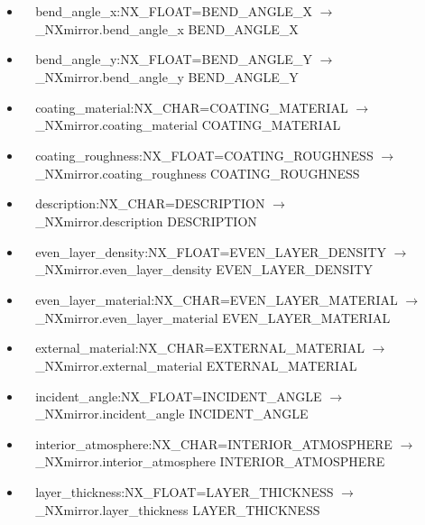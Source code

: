 \documentclass[11pt]{article}
\begin{document}
{{\begin{itemize}
\item{\verb|  |bend\_angle\_x:NX\_FLOAT=BEND\_ANGLE\_X $\rightarrow$\\
\verb|  |\_NXmirror.bend\_angle\_x BEND\_ANGLE\_X}

\item{\verb|  |bend\_angle\_y:NX\_FLOAT=BEND\_ANGLE\_Y $\rightarrow$\\
\verb|  |\_NXmirror.bend\_angle\_y BEND\_ANGLE\_Y}

\item{\verb|  |coating\_material:NX\_CHAR=COATING\_MATERIAL $\rightarrow$\\
\verb|  |\_NXmirror.coating\_material COATING\_MATERIAL}

\item{\verb|  |coating\_roughness:NX\_FLOAT=COATING\_ROUGHNESS $\rightarrow$\\
\verb|  |\_NXmirror.coating\_roughness COATING\_ROUGHNESS}

\item{\verb|  |description:NX\_CHAR=DESCRIPTION $\rightarrow$\\
\verb|  |\_NXmirror.description DESCRIPTION}

\item{\verb|  |even\_layer\_density:NX\_FLOAT=EVEN\_LAYER\_DENSITY $\rightarrow$\\
\verb|  |\_NXmirror.even\_layer\_density EVEN\_LAYER\_DENSITY}

\item{\verb|  |even\_layer\_material:NX\_CHAR=EVEN\_LAYER\_MATERIAL $\rightarrow$\\
\verb|  |\_NXmirror.even\_layer\_material EVEN\_LAYER\_MATERIAL}

\item{\verb|  |external\_material:NX\_CHAR=EXTERNAL\_MATERIAL $\rightarrow$\\
\verb|  |\_NXmirror.external\_material EXTERNAL\_MATERIAL}

\item{\verb|  |incident\_angle:NX\_FLOAT=INCIDENT\_ANGLE $\rightarrow$\\
\verb|  |\_NXmirror.incident\_angle INCIDENT\_ANGLE}

\item{\verb|  |interior\_atmosphere:NX\_CHAR=INTERIOR\_ATMOSPHERE $\rightarrow$\\
\verb|  |\_NXmirror.interior\_atmosphere INTERIOR\_ATMOSPHERE}

\item{\verb|  |layer\_thickness:NX\_FLOAT=LAYER\_THICKNESS $\rightarrow$\\
\verb|  |\_NXmirror.layer\_thickness LAYER\_THICKNESS}


\end{itemize}}}
\end{document}
